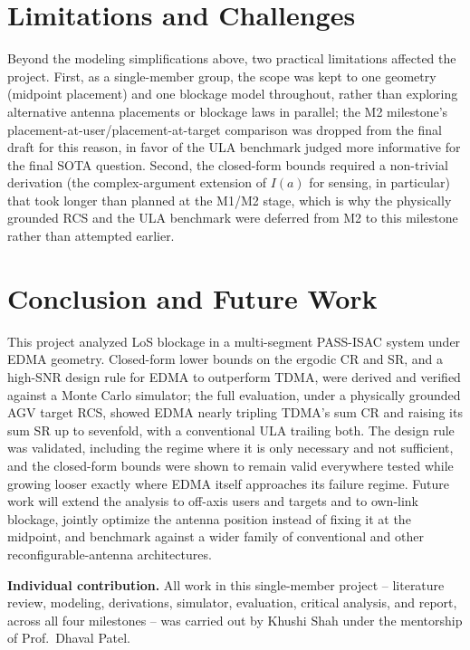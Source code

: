\documentclass[11pt,a4paper]{article}
\begin{document}
\section{Limitations and Challenges}
Beyond the modeling simplifications above, two practical limitations affected the project. First, as a single-member group, the scope was kept to one geometry (midpoint placement) and one blockage model throughout, rather than exploring alternative antenna placements or blockage laws in parallel; the M2 milestone's placement-at-user/placement-at-target comparison was dropped from the final draft for this reason, in favor of the ULA benchmark judged more informative for the final SOTA question. Second, the closed-form bounds required a non-trivial derivation (the complex-argument extension of $I(a)$ for sensing, in particular) that took longer than planned at the M1/M2 stage, which is why the physically grounded RCS and the ULA benchmark were deferred from M2 to this milestone rather than attempted earlier.

\section{Conclusion and Future Work}
This project analyzed LoS blockage in a multi-segment PASS-ISAC system under EDMA geometry. Closed-form lower bounds on the ergodic CR and SR, and a high-SNR design rule for EDMA to outperform TDMA, were derived and verified against a Monte Carlo simulator; the full evaluation, under a physically grounded AGV target RCS, showed EDMA nearly tripling TDMA's sum CR and raising its sum SR up to sevenfold, with a conventional ULA trailing both. The design rule was validated, including the regime where it is only necessary and not sufficient, and the closed-form bounds were shown to remain valid everywhere tested while growing looser exactly where EDMA itself approaches its failure regime. Future work will extend the analysis to off-axis users and targets and to own-link blockage, jointly optimize the antenna position instead of fixing it at the midpoint, and benchmark against a wider family of conventional and other reconfigurable-antenna architectures.

\noindent\textbf{Individual contribution.} All work in this single-member project -- literature review, modeling, derivations, simulator, evaluation, critical analysis, and report, across all four milestones -- was carried out by Khushi Shah under the mentorship of Prof.\ Dhaval Patel.

\footnotesize


\end{document}
